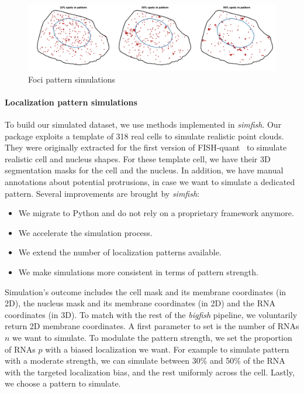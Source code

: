 \begin{figure}[h]
    \centering
    \includegraphics[width=1\textwidth]{figures/chapter4/foci_panel}
    \caption{Foci pattern simulations}
    \label{fig:foci_panel}
\end{figure}

\paragraph{Localization pattern simulations}

To build our simulated dataset, we use methods implemented in \emph{simfish}.
Our package exploits a template of 318 real cells to simulate realistic point clouds.
They were originally extracted for the first version of FISH-quant~\cite{samacoits_computational_2018} to simulate realistic cell and nucleus shapes.
For these template cell, we have their 3D segmentation masks for the cell and the nucleus.
In addition, we have manual annotations about potential protrusions, in case we want to simulate a dedicated pattern.
Several improvements are brought by \emph{simfish}:
\begin{itemize}
	\item We migrate to Python and do not rely on a proprietary framework anymore.
	\item We accelerate the simulation process.
	\item We extend the number of localization patterns available.
	\item We make simulations more consistent in terms of pattern strength.
\end{itemize}

Simulation's outcome includes the cell mask and its membrane coordinates (in 2D), the nucleus mask and its membrane coordinates (in 2D) and the \ac{RNA} coordinates (in 3D).
To match with the rest of the \emph{bigfish} pipeline, we voluntarily return 2D membrane coordinates.
A first parameter to set is the number of \ac{RNA}s $n$ we want to simulate.
To modulate the pattern strength, we set the proportion of \ac{RNA}s $p$ with a biased localization we want.
For example to simulate pattern with a moderate strength, we can simulate between 30\% and 50\% of the \ac{RNA} with the targeted localization bias, and the rest uniformly across the cell.
Lastly, we choose a pattern to simulate.

